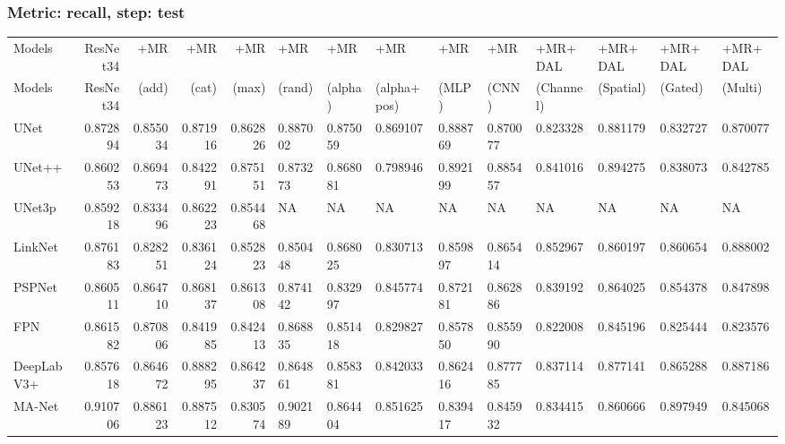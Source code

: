 \documentclass{article}
\begin{document}
\subsubsection{Metric: recall, step: test}
\begin{tabular}{lrrrrlllllllll}
\toprule
Models & ResNet34 & +MR  & +MR  & +MR  & +MR  & +MR  & +MR  & +MR  & +MR  & +MR+DAL & +MR+DAL & +MR+DAL & +MR+DAL \\
Models & ResNet34 &  (add) &  (cat) &  (max) &  (rand) &  (alpha) &  (alpha+pos) &  (MLP) &  (CNN) & (Channel) & (Spatial) & (Gated) & (Multi) \\
\midrule
UNet & 0.872894 & 0.855034 & 0.871916 & 0.862826 & 0.887002 & 0.875059 & 0.869107 & 0.888769 & 0.870077 & 0.823328 & 0.881179 & 0.832727 & 0.870077 \\
UNet++ & 0.860253 & 0.869473 & 0.842291 & 0.875151 & 0.873273 & 0.868081 & 0.798946 & 0.892199 & 0.885457 & 0.841016 & 0.894275 & 0.838073 & 0.842785 \\
UNet3p & 0.859218 & 0.833496 & 0.862223 & 0.854468 & NA & NA & NA & NA & NA & NA & NA & NA & NA \\
LinkNet & 0.876183 & 0.828251 & 0.836124 & 0.852823 & 0.850448 & 0.868025 & 0.830713 & 0.859897 & 0.865414 & 0.852967 & 0.860197 & 0.860654 & 0.888002 \\
PSPNet & 0.860511 & 0.864710 & 0.868137 & 0.861308 & 0.874142 & 0.832997 & 0.845774 & 0.872181 & 0.862886 & 0.839192 & 0.864025 & 0.854378 & 0.847898 \\
FPN & 0.861582 & 0.870806 & 0.841985 & 0.842413 & 0.868835 & 0.851418 & 0.829827 & 0.857850 & 0.855990 & 0.822008 & 0.845196 & 0.825444 & 0.823576 \\
DeepLabV3+ & 0.857618 & 0.864672 & 0.888295 & 0.864237 & 0.864861 & 0.858381 & 0.842033 & 0.862416 & 0.877785 & 0.837114 & 0.877141 & 0.865288 & 0.887186 \\
MA-Net & 0.910706 & 0.886123 & 0.887512 & 0.830574 & 0.902189 & 0.864404 & 0.851625 & 0.839417 & 0.845932 & 0.834415 & 0.860666 & 0.897949 & 0.845068 \\
\bottomrule
\end{tabular}
\end{document}
